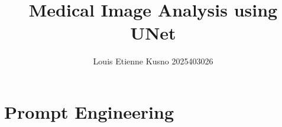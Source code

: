 \documentclass[11pt,a4paper,twocolumn]{article}
\title{\textbf{Medical Image Analysis using UNet}}
\author{Louis Etienne Kusno 2025403026}
\date{}
\begin{document}
\maketitle

\section{Prompt Engineering}
\end{document}
